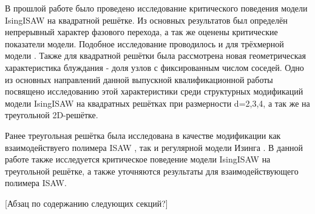 В прошлой работе \cite{faizullina2021critical} было проведено исследование критического поведения модели IsingISAW на квадратной решётке.
Из основных результатов был определён непрерывный характер фазового перехода, а так же оценены критические показатели модели.
Подобное исследование проводилось и для трёхмерной модели \cite{foster2021critical}.
Также для квадратной решётки была рассмотрена новая геометрическая характеристика блуждания - доля узлов с фиксированным числом соседей. 
Одно из основных направлений данной выпускной квалификационной работы посвящено исследованию этой характеристики среди 
структурных модификаций модели IsingISAW на квадратных решётках при размерности d=2,3,4, а так же на треугольной 2D-решётке.

Ранее треугольная решётка была исследована в качестве модификации как взаимодействуего полимера ISAW \cite{Privman1986}, 
так и регулярной модели Изинга \cite{ShchurTriangle, selke2006critical}. 
В данной работе также исследуется критическое поведение модели IsingISAW на треугольной решётке, а также уточняются результаты для взаимодействующего полимера ISAW.

[Абзац по содержанию следующих секций?]
